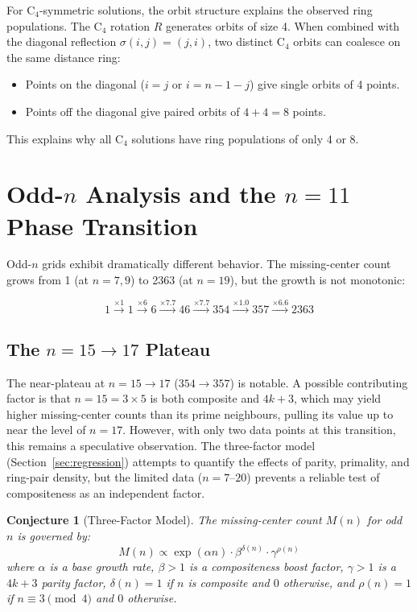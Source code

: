\documentclass[11pt,a4paper]{article}
\theoremstyle{plain}
\newtheorem{conjecture}[theorem]{Conjecture}
\theoremstyle{definition}
\begin{document}
For C$_4$-symmetric solutions, the orbit structure explains the observed ring populations. The C$_4$ rotation $R$ generates orbits of size 4. When combined with the diagonal reflection $\sigma(i,j)=(j,i)$, two distinct C$_4$ orbits can coalesce on the same distance ring:

\begin{itemize}
\item Points on the diagonal ($i=j$ or $i=n-1-j$) give single orbits of 4 points.
\item Points off the diagonal give paired orbits of $4+4=8$ points.
\end{itemize}

This explains why all C$_4$ solutions have ring populations of only 4 or 8.

\section{Odd-$n$ Analysis and the $n=11$ Phase Transition}
\label{sec:odd}

Odd-$n$ grids exhibit dramatically different behavior. The missing-center count grows from 1 (at $n=7,9$) to 2363 (at $n=19$), but the growth is not monotonic:

\begin{equation}
1 \xrightarrow{\times1} 1 \xrightarrow{\times6} 6 \xrightarrow{\times7.7} 46 \xrightarrow{\times7.7} 354 \xrightarrow{\times1.0} 357 \xrightarrow{\times6.6} 2363
\end{equation}

\subsection{The $n=15\to17$ Plateau}

The near-plateau at $n=15\to17$ ($354\to357$) is notable. A possible contributing factor is that $n=15=3\times5$ is both composite and $4k+3$, which may yield higher missing-center counts than its prime neighbours, pulling its value up to near the level of $n=17$. However, with only two data points at this transition, this remains a speculative observation. The three-factor model (Section~\ref{sec:regression}) attempts to quantify the effects of parity, primality, and ring-pair density, but the limited data ($n=7$--$20$) prevents a reliable test of compositeness as an independent factor.

\begin{conjecture}[Three-Factor Model]
\label{conj:three}
The missing-center count $M(n)$ for odd $n$ is governed by:
\[
M(n) \propto \exp(\alpha n) \cdot \beta^{\delta(n)} \cdot \gamma^{\rho(n)}
\]
where $\alpha$ is a base growth rate, $\beta>1$ is a compositeness boost factor, $\gamma>1$ is a $4k+3$ parity factor, $\delta(n)=1$ if $n$ is composite and $0$ otherwise, and $\rho(n)=1$ if $n\equiv3\pmod{4}$ and $0$ otherwise.
\end{conjecture}
\end{document}
